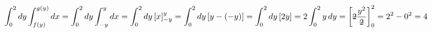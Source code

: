 \documentclass[12pt, a4paper]{article}
\newcommand{\integral}{\displaystyle\int}
\newcommand{\overstrike}[1]{\ifmmode\text{\sout{\ensuremath{#1}}}\else\sout{#1}\fi}
\begin{document}
\begin{enumerate}
				$\integral_0^2 dy \integral_{f(y)}^{g(y)} dx = \integral_0^2 dy \integral_{-y}^y dx =
				\integral_0^2 dy\, [x]_{-y}^y = \integral_0^2 dy\, [y - (-y)] = 
				\integral_0^2 dy\, [2y] = 2\integral_0^2 y\, dy = \left[\overstrike{2}\frac{y^2}{\overstrike{2}}\right]_0^2 = 2^2 - 0^2 = 4$
				
			\end{enumerate}
		
		
		
		
		
		
		
		
	
\end{document}
